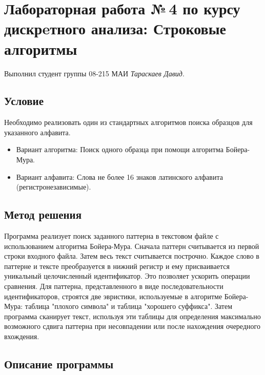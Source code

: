 \documentclass[12pt]{article}
\begin{document}
\section*{Лабораторная работа №\,4 по курсу дискрeтного анализа: Строковые алгоритмы}

Выполнил студент группы 08-215 МАИ \textit{Тараскаев Давид}.

\subsection*{Условие}

Необходимо реализовать один из стандартных алгоритмов поиска образцов для указанного алфавита.

\begin{itemize}
    \item Вариант алгоритма: Поиск одного образца при помощи алгоритма Бойера-Мура.
    \item Вариант алфавита: Слова не более 16 знаков латинского алфавита (регистронезависимые).
\end{itemize}

\subsection*{Метод решения}

Программа реализует поиск заданного паттерна в текстовом файле с использованием алгоритма Бойера-Мура.
Сначала паттерн считывается из первой строки входного файла. Затем весь текст считывается построчно. Каждое слово в паттерне и тексте преобразуется в нижний регистр и ему присваивается уникальный целочисленный идентификатор. Это позволяет ускорить операции сравнения.
Для паттерна, представленного в виде последовательности идентификаторов, строятся две эвристики, используемые в алгоритме Бойера-Мура: таблица "плохого символа" и таблица "хорошего суффикса".
Затем программа сканирует текст, используя эти таблицы для определения максимально возможного сдвига паттерна при несовпадении или после нахождения очередного вхождения.

\subsection*{Описание программы}
\end{document}
